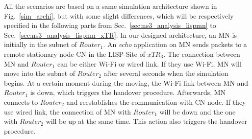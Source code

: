 {%

All the scenarios are based on a same simulation architecture shown in Fig.~\ref{sim_archi}, but with some slight differences, which will be respectively specified in the following parts from Sec.~\ref{sec:ns3_analysis_lispmn} to Sec.~\ref{sec:ns3_analysis_lispmn_xTR}. In our designed architecture, an MN is initially in the subnet of $Router_1$. An \emph{echo} application on MN sends packets to a remote stationary node CN in the LISP-Site of $xTR_3$. The connection between MN and $Router_1$ can be either Wi-Fi or wired link. If they use Wi-Fi, MN will move into the subnet of $Router_2$ after several seconds when the simulation begins. At a certain moment during the moving, the Wi-Fi link between MN and $Router_1$ is down, which triggers the handover procedure. Afterwards, MN connects to $Router_2$ and reestablishes the communication with CN node. If they use wired link, the connection of MN with $Router_1$ will be down and the one with $Router_2$ will be up at the same time. This action also triggers the handover procedure.

}
